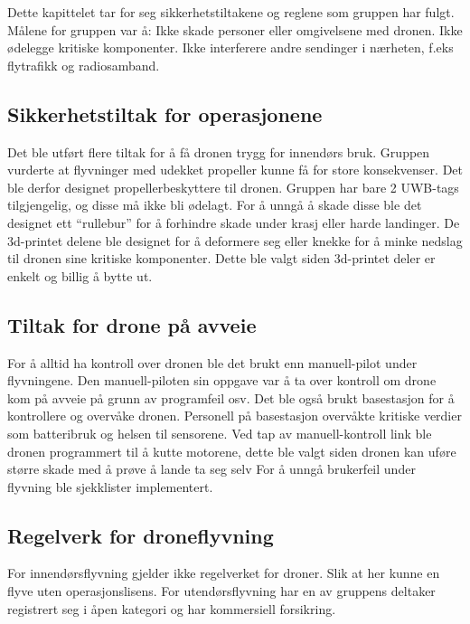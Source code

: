 Dette kapittelet tar for seg sikkerhetstiltakene og reglene som gruppen har fulgt. Målene for gruppen var å: Ikke skade personer eller omgivelsene med dronen. Ikke ødelegge kritiske komponenter. Ikke interferere andre sendinger i nærheten, f.eks flytrafikk og radiosamband.

\subsection{Sikkerhetstiltak for operasjonene}
Det ble utført flere tiltak for å få dronen trygg for innendørs bruk. Gruppen vurderte at flyvninger med udekket propeller kunne få for store konsekvenser.  Det ble derfor designet propellerbeskyttere til dronen.
Gruppen har bare 2 UWB-tags tilgjengelig, og disse må ikke bli ødelagt. For å unngå å skade disse ble det designet ett “rullebur” for å forhindre skade under krasj eller harde landinger. 
De 3d-printet delene ble designet for å deformere seg eller knekke for å minke nedslag til dronen sine kritiske komponenter. Dette ble valgt siden 3d-printet deler er enkelt og billig å bytte ut. 

\subsection{Tiltak for drone på avveie}
For å alltid ha kontroll over dronen ble det brukt enn manuell-pilot under flyvningene. Den manuell-piloten sin oppgave var å ta over kontroll om drone kom på avveie på grunn av programfeil osv.  Det ble også brukt basestasjon for å kontrollere og overvåke dronen. Personell på basestasjon overvåkte kritiske verdier som batteribruk og helsen til sensorene. 
Ved tap av manuell-kontroll link ble dronen programmert til å kutte motorene, dette ble valgt siden dronen kan uføre større skade med å prøve å lande ta seg selv 
For å unngå brukerfeil under flyvning ble sjekklister implementert. 

\subsection{Regelverk for droneflyvning}
For innendørsflyvning gjelder ikke regelverket for droner. Slik at her kunne en flyve uten operasjonslisens. 
For utendørsflyvning har en av gruppens deltaker registrert seg i åpen kategori og har kommersiell forsikring. 

